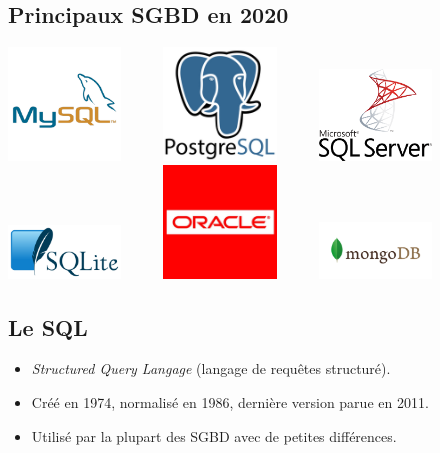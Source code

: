 \subsection{Principaux SGBD en 2020}
\includegraphics[width=3cm]{img/mysql}\ \ \ \ \ \ \includegraphics[width=3cm]{img/postgresql}\ \ \ \ \ \ \includegraphics[width=3cm]{img/microsoftsqlserver}\\[2em]
\includegraphics[width=3cm]{img/sqlite}\ \ \ \ \ \ \includegraphics[width=3cm]{img/oracle}\ \ \ \ \ \ \includegraphics[width=3cm]{img/mongodb}


\subsection{Le SQL}
\begin{itemize}
    \item	\textit{Structured Query Langage} (langage de requêtes structuré).
    \item	Créé en 1974, normalisé en 1986, dernière version parue en 2011.
    \item 	Utilisé par la plupart des SGBD avec de petites différences.
\end{itemize}



